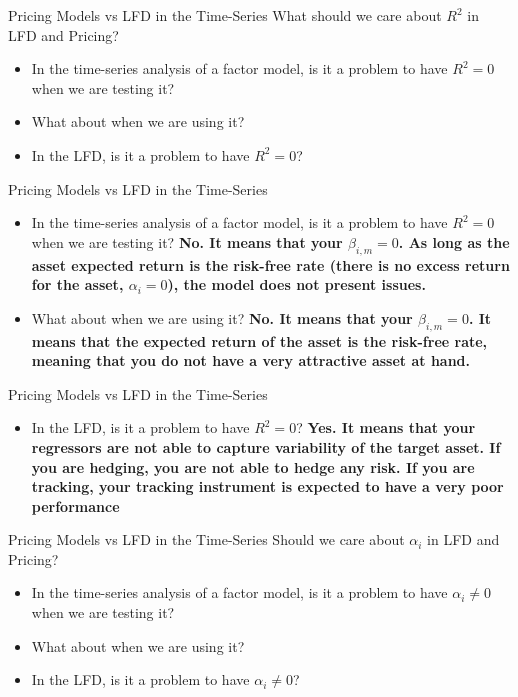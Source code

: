 \documentclass{beamer}
\begin{document}
\begin{frame}{Pricing Models vs LFD in the Time-Series}
What should we care about $R^2$ in LFD and Pricing?
    \begin{itemize}
        \item In the time-series analysis of a factor model, is it a problem to have $R^2 = 0$ when we are testing it?
        \item What about when we are using it?
        \item In the LFD, is it a problem to have $R^2 = 0$? 
    \end{itemize}
\end{frame}

\begin{frame}{Pricing Models vs LFD in the Time-Series}
    \begin{itemize}
        \item In the time-series analysis of a factor model, is it a problem to have $R^2 = 0$ when we are testing it? \textbf{No. It means that your $\beta_{i, m} = 0$. As long as the asset expected return is the risk-free rate (there is no excess return for the asset, $\alpha_i = 0$), the model does not present issues.}
        \item What about when we are using it? \textbf{No. It means that your $\beta_{i, m} = 0$. It means that the expected return of the asset is the risk-free rate, meaning that you do not have a very attractive asset at hand.}
    \end{itemize}
\end{frame}

\begin{frame}{Pricing Models vs LFD in the Time-Series}
    \begin{itemize}
        \item In the LFD, is it a problem to have $R^2 = 0$? \textbf{Yes. It means that your regressors are not able to capture variability of the target asset. If you are hedging, you are not able to hedge any risk. If you are tracking, your tracking instrument is expected to have a very poor performance}
    \end{itemize}
\end{frame}

\begin{frame}{Pricing Models vs LFD in the Time-Series}
        Should we care about $\alpha_i$ in LFD and Pricing?
        \begin{itemize}
            \item In the time-series analysis of a factor model, is it a problem to have $\alpha_i \neq 0$ when we are testing it?
            \item What about when we are using it?
            \item In the LFD, is it a problem to have $\alpha_i \neq 0$? 
        \end{itemize}
\end{frame}
\end{document}
